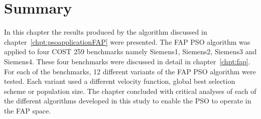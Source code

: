 \section{Summary}
In this chapter the results produced by the algorithm discussed in chapter~\ref{chpt:psoapplicationFAP} were presented. The FAP PSO algorithm was applied to four COST 259 benchmarks namely Siemens1, Siemens2, Siemens3 and Siemens4. These four benchmarks were discussed in detail in chapter~\ref{chpt:fap}. For each of the benchmarks, 12 different variants of the FAP PSO algorithm were tested. Each variant used a different velocity function, global best selection scheme or population size. The chapter concluded with critical analyses of each of the different algorithms developed in this study to enable the PSO to operate in the FAP space.
